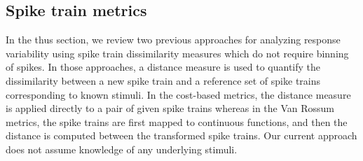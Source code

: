 
\subsection{Spike train metrics}

In the thus section, we review two previous approaches for analyzing response variability using spike train dissimilarity measures which do not require binning of spikes. In those approaches, a distance measure is used to quantify the dissimilarity between a new spike train and a reference set of spike trains corresponding to known stimuli. In the cost-based metrics,
the distance measure is applied directly to a pair of given spike trains whereas in the Van Rossum metrics, the spike trains are first mapped to continuous functions, and then the distance is computed between the transformed spike trains. Our current approach does not assume knowledge of any underlying stimuli.\\

